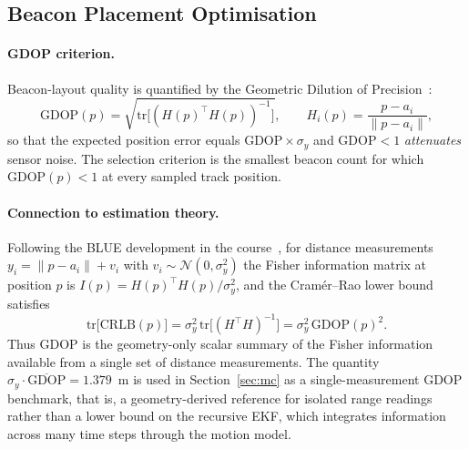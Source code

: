 \documentclass[11pt,a4paper]{article}
\begin{document}
\subsection{Beacon Placement Optimisation}
\label{sec:beacon}

\paragraph{GDOP criterion.}
Beacon-layout quality is quantified by the Geometric Dilution of
Precision~\cite{Langley1999}:
\begin{equation}
\mathrm{GDOP}(p)=\sqrt{\mathrm{tr}\bigl[(H(p)^{\!\top}H(p))^{-1}\bigr]},
\qquad
H_i(p)=\frac{p-a_i}{\|p-a_i\|},
\label{eq:gdop}
\end{equation}
so that the expected position error equals
$\mathrm{GDOP}\times\sigma_y$ and $\mathrm{GDOP}<1$ \emph{attenuates}
sensor noise. The selection criterion is the smallest beacon count
for which $\mathrm{GDOP}(p)<1$ at every sampled track position.

\paragraph{Connection to estimation theory.}
Following the BLUE development in the course~\cite{KalmanV}, for
distance measurements $y_i=\|p-a_i\|+v_i$ with
$v_i\sim\mathcal{N}(0,\sigma_y^2)$ the Fisher information matrix at
position $p$ is $I(p)=H(p)^{\!\top}H(p)/\sigma_y^2$, and the
Cram\'er--Rao lower bound satisfies
\begin{equation}
\mathrm{tr}\bigl[\mathrm{CRLB}(p)\bigr]
=\sigma_y^2\,\mathrm{tr}\bigl[(H^{\!\top}H)^{-1}\bigr]
=\sigma_y^2\,\mathrm{GDOP}(p)^2.
\label{eq:crlb}
\end{equation}
Thus GDOP is the geometry-only scalar summary of the Fisher
information available from a single set of distance measurements.
The quantity $\sigma_y\cdot\overline{\mathrm{GDOP}}=1.379$~m is used
in Section~\ref{sec:mc} as a single-measurement GDOP benchmark, that
is, a geometry-derived reference for isolated range readings rather
than a lower bound on the recursive EKF, which integrates information
across many time steps through the motion model.
\end{document}
